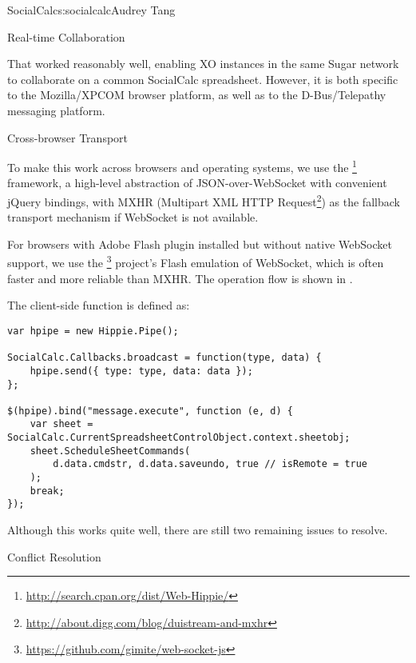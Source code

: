 \begin{aosachapter}{SocialCalc}{s:socialcalc}{Audrey Tang}
\begin{aosasect1}{Real-time Collaboration}

That worked reasonably well, enabling XO instances in the same Sugar
network to collaborate on a common SocialCalc spreadsheet.  However,
it is both specific to the Mozilla/XPCOM browser platform, as well as
to the D-Bus/Telepathy messaging platform.

\begin{aosasect2}{Cross-browser Transport}

To make this work across browsers and operating systems, we use the
\footnote{\url{http://search.cpan.org/dist/Web-Hippie/}}
framework, a high-level abstraction of JSON-over-WebSocket with
convenient jQuery bindings, with MXHR (Multipart XML HTTP
Request\footnote{\url{http://about.digg.com/blog/duistream-and-mxhr}})
as the fallback transport mechanism if WebSocket is not available.

For browsers with Adobe Flash plugin installed but without native
WebSocket support, we use the
\footnote{\url{https://github.com/gimite/web-socket-js}}
project's Flash emulation of WebSocket, which is often faster and more reliable
than MXHR.  The operation flow is shown in .


\pagebreak

The client-side  function is
defined as:

\begin{verbatim}
var hpipe = new Hippie.Pipe();

SocialCalc.Callbacks.broadcast = function(type, data) {
    hpipe.send({ type: type, data: data });
};

$(hpipe).bind("message.execute", function (e, d) {
    var sheet = SocialCalc.CurrentSpreadsheetControlObject.context.sheetobj;
    sheet.ScheduleSheetCommands(
        d.data.cmdstr, d.data.saveundo, true // isRemote = true
    );
    break;
});
\end{verbatim}

\noindent Although this works quite well, there are still two remaining issues
to resolve.

\end{aosasect2}

\begin{aosasect2}{Conflict Resolution}


\end{aosasect2}
\end{aosasect1}
\end{aosachapter}

